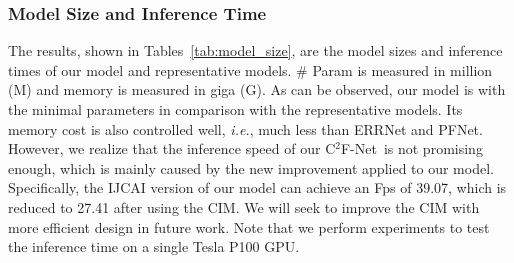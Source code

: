 \documentclass[lettersize,journal]{IEEEtran}
\newcommand{\ourM}{{C$^2$F-Net}}
\def\ie{\emph{i.e.}}
\begin{document}
\subsubsection{Model Size and Inference Time}
The results, shown in Tables~\ref{tab:model_size}, are the model sizes and inference times of our model and representative models. \# Param is measured in million (M) and memory is measured in giga (G).
As can be observed, our model is with the minimal parameters in comparison with the representative models. Its memory cost is also controlled well, \ie, much less than ERRNet and PFNet.
However, we realize that the inference speed of our \ourM~is not promising enough, which is mainly caused by the new improvement applied to our model. Specifically, the IJCAI version of our model can achieve an Fps of 39.07, which is reduced to 27.41 after using the CIM. We will seek to improve the CIM with more efficient design in future work.
Note that we perform experiments to test the inference time on a single Tesla P100 GPU.

\begin{table}[t]
	\centering
	\small
	\caption{\small Comparison of model size and inference time.
	}\label{tab:model_size}
	\renewcommand{\arraystretch}{1.2}
	\setlength{\tabcolsep}{5pt}
	
\end{table}
\end{document}
